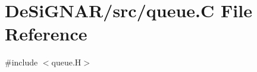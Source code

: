 \hypertarget{queue_8_c}{}\section{De\+Si\+G\+N\+A\+R/src/queue.C File Reference}
\label{queue_8_c}
{\ttfamily \#include $<$queue.\+H$>$}\newline
